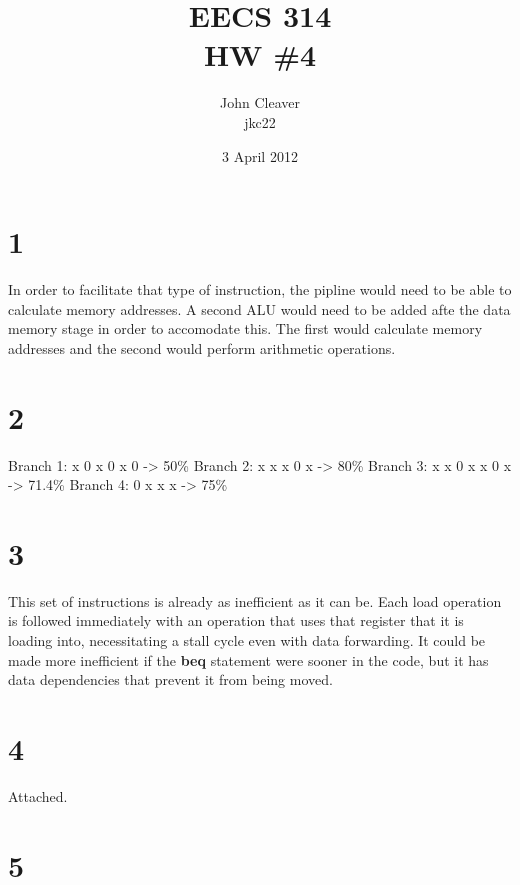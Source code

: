 \documentclass{article}
\title{EECS 314 \\ HW \#4}
\author{John Cleaver \\ jkc22}
\date{3 April 2012}
\begin{document}
\maketitle

\section*{1}

In order to facilitate that type of instruction, the pipline would need to be able to calculate memory addresses. A second ALU would need to be added afte the data memory stage in order to accomodate this. The first would calculate memory addresses and the second would perform arithmetic operations.

\section*{2}

Branch 1: x 0 x 0 x 0 -> 50\%
Branch 2: x x x 0 x -> 80\%
Branch 3: x x 0 x x 0 x -> 71.4\%
Branch 4: 0 x x x -> 75\%

\section*{3}

This set of instructions is already as inefficient as it can be. Each load operation is followed immediately with an operation that uses that register that it is loading into, necessitating a stall cycle even with data forwarding. It could be made more inefficient if the {\bf beq} statement were sooner in the code, but it has data dependencies that prevent it from being moved.

\section*{4}

Attached.

\pagebreak
\section*{5}
\end{document}
